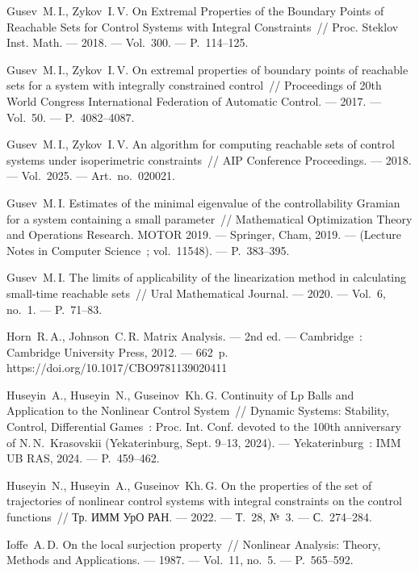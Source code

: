 \documentclass[../main.tex]{subfiles}
\begin{document}
\begin{thebibliography}{99}
Gusev~M.\,I., Zykov~I.\,V. On Extremal Properties of the Boundary Points of Reachable Sets for Control Systems with Integral Constraints~// Proc. Steklov Inst. Math. --- 2018. --- Vol.~300. --- P.~114--125.

Gusev~M.\,I., Zykov~I.\,V. On extremal properties of boundary points of reachable sets for a system with integrally constrained control~// Proceedings of 20th World Congress International Federation of Automatic Control. --- 2017. --- Vol.~50. --- P.~4082--4087. 

Gusev~M.\,I., Zykov~I.\,V. An algorithm for computing reachable sets of control systems under isoperimetric constraints~// AIP Conference Proceedings. --- 2018. --- Vol.~2025. --- Art.~no.~020021.

Gusev~M.\,I. Estimates of the minimal eigenvalue of the controllability Gramian for a system containing a small parameter~// Mathematical Optimization Theory and Operations Research. MOTOR 2019. --- Springer, Cham, 2019. --- (Lecture Notes in Computer Science~; vol.~11548). --- P.~383--395. 

Gusev~M.\,I. The limits of applicability of the linearization method in calculating small-time reachable sets~// Ural Mathematical Journal. --- 2020. --- Vol.~6, no.~1. --- P.~71--83.

Horn~R.\,A., Johnson~C.\,R. Matrix Analysis. --- 2nd ed. --- Cambridge~: Cambridge University Press, 2012. --- 662~p. https://doi.org/10.1017/CBO9781139020411

Huseyin~A., Huseyin~N., Guseinov~Kh.\,G. Continuity of Lp Balls and Application to the Nonlinear Control System~// Dynamic Systems: Stability, Control, Differential Games~: Proc. Int. Conf. devoted to the 100th anniversary of N.\,N.~Krasovskii (Yekaterinburg, Sept. 9--13, 2024). --- Yekaterinburg~: IMM UB RAS, 2024. --- P.~459--462.

Huseyin~N., Huseyin~A., Guseinov~Kh.\,G. On the properties of the set of trajectories of nonlinear control systems with integral constraints on the control functions~// Тр. ИММ УрО РАН. --- 2022. --- Т.~28, №~3. --- С.~274--284.

Ioffe~A.\,D. On the local surjection property~// Nonlinear Analysis: Theory, Methods and Applications. --- 1987. --- Vol.~11, no.~5. --- P.~565--592.



\end{thebibliography}
\end{document}

